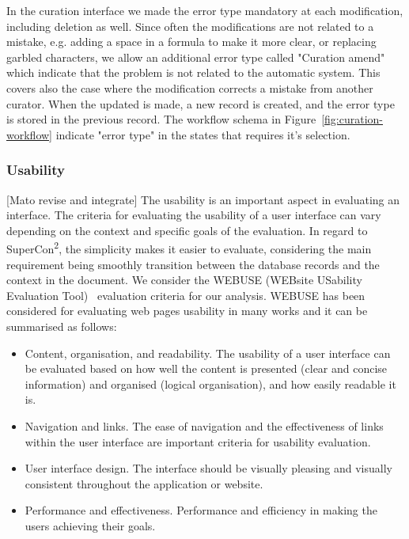 \documentclass[a4paper]{article}
\begin{document}
In the curation interface we made the error type mandatory at each modification, including deletion as well. Since often the modifications are not related to a mistake, e.g. adding a space in a formula to make it more clear, or replacing garbled characters, we allow an additional error type called "Curation amend" which indicate that the problem is not related to the automatic system. This covers also the case where the modification corrects a mistake from another curator. 
When the updated is made, a new record is created, and the error type is stored in the previous record. The workflow schema in Figure~\ref{fig:curation-workflow} indicate "error type" in the states that requires it's selection. 

\subsubsection{Usability}

[Mato revise and integrate] 
The usability is an important aspect in evaluating an interface. 
The criteria for evaluating the usability of a user interface can vary depending on the context and specific goals of the evaluation. 
In regard to SuperCon\textsuperscript{2}, the simplicity makes it easier to evaluate, considering the main requirement being smoothly transition between the database records and the context in the document. 
We consider the WEBUSE (WEBsite USability Evaluation Tool)~\cite{chiew2003webuse} evaluation criteria for our analysis. WEBUSE has been considered for evaluating web pages usability in many works and it can be summarised as follows: 
\begin{itemize}
    \item Content, organisation, and readability. The usability of a user interface can be evaluated based on how well the content is presented (clear and concise information) and organised (logical organisation), and how easily readable it is. 
    \item Navigation and links. The ease of navigation and the effectiveness of links within the user interface are important criteria for usability evaluation. 
    \item User interface design. The interface should be visually pleasing and visually consistent throughout the application or website. 
    \item Performance and effectiveness. Performance and efficiency in making the users achieving their goals.
\end{itemize}
\end{document}
